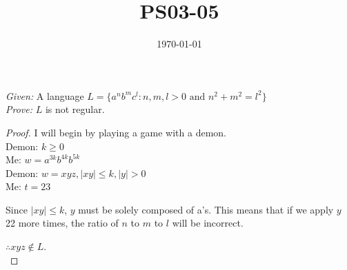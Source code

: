 \documentclass{article}
\title{PS03-05}
\date{\today}
\begin{document}
\maketitle
\noindent\textit{Given: } A language $L = \{a^nb^mc^l:n,m,l > 0 
\text{ and }n^2 + m^2 = l^2\}$\\
\textit{Prove: } $L$ is not regular.
\begin{proof}
I will begin by playing a game with a demon.\\
Demon: $k \geq 0$\\
Me: $w = a^{3k}b^{4k}b^{5k}$\\
Demon: $w = xyz, \mid xy \mid \leq k, \mid y \mid > 0$\\
Me: $t = 23$

Since $\mid xy \mid \leq k$, $y$ must be solely composed
of a's. This means that if we apply $y$ 22 more times,
the ratio of $n$ to $m$ to $l$ will be incorrect.

$\therefore xyz \notin L$.\\
\end{proof}
\end{document}
